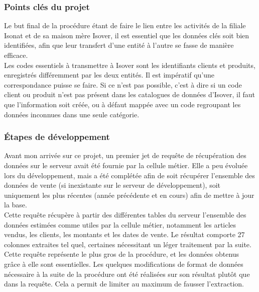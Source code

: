 \documentclass[a4paper,12pt]{article}
\begin{document}
\subsubsection{Points clés du projet}
Le but final de la procédure étant de faire le lien entre les activités de la filiale Isonat et de sa maison mère Isover, il est essentiel que les données clés soit bien identifiées, afin que leur transfert d'une entité à l'autre se fasse de manière efficace. \\

Les codes essentiels à transmettre à Isover sont les identifiants clients et produits, enregistrés différemment par les deux entités. Il est impératif qu'une correspondance puisse se faire. Si ce n'est pas possible, c'est à dire si un code client ou produit n'est pas présent dans les catalogues de données d'Isover, il faut que l'information soit créée, ou à défaut mappée avec un code regroupant les données inconnues dans une seule catégorie.

\subsubsection{Étapes de développement} 
Avant mon arrivée sur ce projet, un premier jet de requête de récupération des données sur le serveur avait été fournie par la cellule métier. Elle a peu évoluée lors du développement, mais a été complétée afin de soit récupérer l'ensemble des données de vente (si inexistante sur le serveur de développement), soit uniquement les plus récentes (année précédente et en cours) afin de mettre à jour la base. \\
Cette requête récupère à partir des différentes tables du serveur l'ensemble des données estimées comme utiles par la cellule métier, notamment les articles vendus, les clients, les montants et les dates de vente. Le résultat comporte 27 colonnes extraites tel quel, certaines nécessitant un léger traitement par la suite. \\
Cette requête représente le plus gros de la procédure, et les données obtenus grâce à elle sont essentielles. Les quelques modifications de format de données nécessaire à la suite de la procédure ont été réalisées sur son résultat plutôt que dans la requête. Cela a permit de limiter au maximum de fausser l'extraction.\\
\end{document}
